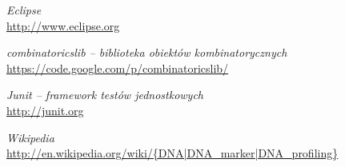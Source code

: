 \documentclass[11pt,a4paper]{article}
\begin{document}
\begin{thebibliography}{9}

	\emph{Eclipse}\\
	\url{http://www.eclipse.org}
		
	\emph{combinatoricslib -- biblioteka obiektów kombinatorycznych}\\
	\url{https://code.google.com/p/combinatoricslib/}

	\emph{Junit -- framework testów jednostkowych}\\
	\url{http://junit.org}

	\emph{Wikipedia}\\
	\url{http://en.wikipedia.org/wiki/{DNA|DNA_marker|DNA_profiling}}
\end{thebibliography}
\end{document}
